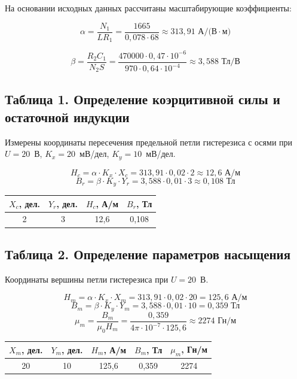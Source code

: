 На основании исходных данных рассчитаны масштабирующие коэффициенты:

\[
\alpha = \frac{N_1}{L R_1} = \frac{1665}{0{,}078 \cdot 68} \approx 313{,}91 \text{ А/(В}\cdot\text{м)}
\]

\[
\beta = \frac{R_2 C_1}{N_2 S} = \frac{470000 \cdot 0{,}47 \cdot 10^{-6}}{970 \cdot 0{,}64 \cdot 10^{-4}} \approx 3{,}588 \text{ Тл/В}
\]

\subsection{Таблица 1. Определение коэрцитивной силы и остаточной индукции}
Измерены координаты пересечения предельной петли гистерезиса с осями при $U=20$~В, $K_x=20$~мВ/дел, $K_y=10$~мВ/дел.

\[
H_c = \alpha \cdot K_x \cdot X_c = 313{,}91 \cdot 0{,}02 \cdot 2 \approx 12{,}6 \text{ А/м}
\]
\[
B_r = \beta \cdot K_y \cdot Y_r = 3{,}588 \cdot 0{,}01 \cdot 3 \approx 0{,}108 \text{ Тл}
\]

\begin{center}
\begin{tabular}{|c|c|c|c|}
\hline
$X_c$, дел. & $Y_r$, дел. & $H_c$, А/м & $B_r$, Тл \\
\hline
2 & 3 & 12{,}6 & 0{,}108 \\
\hline
\end{tabular}
\end{center}

\subsection{Таблица 2. Определение параметров насыщения}
Координаты вершины петли гистерезиса при $U=20$~В.

\[
H_m = \alpha \cdot K_x \cdot X_m = 313{,}91 \cdot 0{,}02 \cdot 20 = 125{,}6 \text{ А/м}
\]
\[
B_m = \beta \cdot K_y \cdot Y_m = 3{,}588 \cdot 0{,}01 \cdot 10 = 0{,}359 \text{ Тл}
\]
\[
\mu_m = \frac{B_m}{\mu_0 H_m} = \frac{0{,}359}{4\pi \cdot 10^{-7} \cdot 125{,}6} \approx 2274 \text{ Гн/м}
\]

\begin{center}
\begin{tabular}{|c|c|c|c|c|}
\hline
$X_m$, дел. & $Y_m$, дел. & $H_m$, А/м & $B_m$, Тл & $\mu_m$, Гн/м \\
\hline
20 & 10 & 125{,}6 & 0{,}359 & 2274 \\
\hline
\end{tabular}
\end{center}

